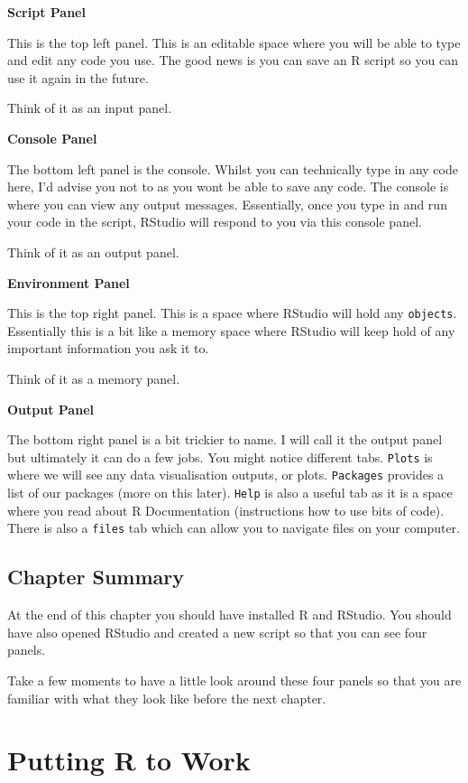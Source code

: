\documentclass[
]{book}
\let\oldsection\section
\renewcommand{\section}{\needspace{5\baselineskip}\oldsection}
\begin{document}
\textbf{Script Panel}

This is the top left panel. This is an editable space where you will be able to type and edit any code you use. The good news is you can save an R script so you can use it again in the future.

Think of it as an input panel.

\textbf{Console Panel}

The bottom left panel is the console. Whilst you can technically type in any code here, I'd advise you not to as you wont be able to save any code. The console is where you can view any output messages. Essentially, once you type in and run your code in the script, RStudio will respond to you via this console panel.

Think of it as an output panel.

\textbf{Environment Panel}

This is the top right panel. This is a space where RStudio will hold any \texttt{objects}. Essentially this is a bit like a memory space where RStudio will keep hold of any important information you ask it to.

Think of it as a memory panel.

\textbf{Output Panel}

The bottom right panel is a bit trickier to name. I will call it the output panel but ultimately it can do a few jobs. You might notice different tabs. \texttt{Plots} is where we will see any data visualisation outputs, or plots. \texttt{Packages} provides a list of our packages (more on this later). \texttt{Help} is also a useful tab as it is a space where you read about R Documentation (instructions how to use bits of code). There is also a \texttt{files} tab which can allow you to navigate files on your computer.

\section{Chapter Summary}\label{chapter-summary}

At the end of this chapter you should have installed R and RStudio. You should have also opened RStudio and created a new script so that you can see four panels.

Take a few moments to have a little look around these four panels so that you are familiar with what they look like before the next chapter.

\chapter{Putting R to Work}\label{putting-r-to-work}
\end{document}
